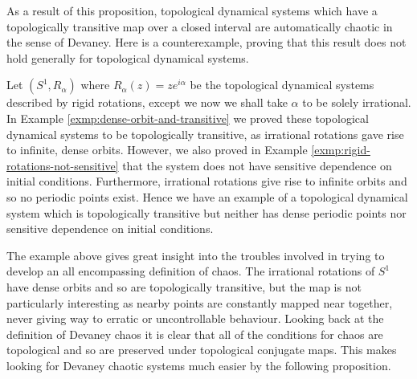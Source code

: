As a result of this proposition, topological dynamical systems which have a topologically transitive map over a closed interval are automatically chaotic in the sense of Devaney. Here is a counterexample, proving that this result does not hold generally for topological dynamical systems.

\begin{exmp}
    Let $(S^1, R_\alpha)$ where $R_\alpha(z) = ze^{i\alpha}$ be the topological dynamical systems described by rigid rotations, except we now we shall take $\alpha$ to be solely irrational. In Example \ref{exmp:dense-orbit-and-transitive} we proved these topological dynamical systems to be topologically transitive, as irrational rotations gave rise to infinite, dense orbits. However, we also proved in Example \ref{exmp:rigid-rotations-not-sensitive} that the system does not have sensitive dependence on initial conditions. Furthermore, irrational rotations give rise to infinite orbits and so no periodic points exist. Hence we have an example of a topological dynamical system which is topologically transitive but neither has dense periodic points nor sensitive dependence on initial conditions.
\end{exmp}

The example above gives great insight into the troubles involved in trying to develop an all encompassing definition of chaos. The irrational rotations of $S^1$ have dense orbits and so are topologically transitive, but the map is not particularly interesting as nearby points are constantly mapped near together, never giving way to erratic or uncontrollable behaviour. Looking back at the definition of Devaney chaos it is clear that all of the conditions for chaos are topological and so are preserved under topological conjugate maps. This makes looking for Devaney chaotic systems much easier by the following proposition.

